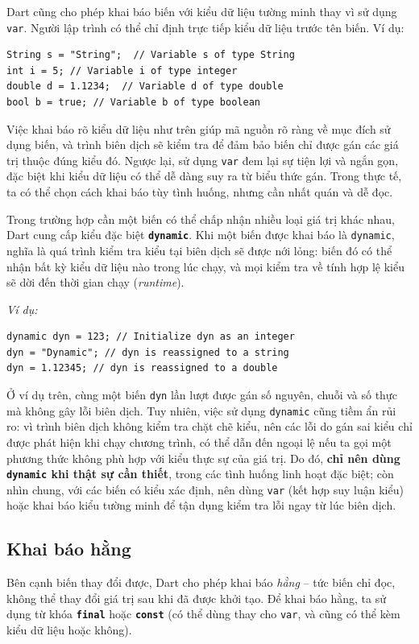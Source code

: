 \documentclass[../DoAn.tex]{subfiles}
\numberwithin{figure}{chapter}
\begin{document}
Dart cũng cho phép khai báo biến với kiểu dữ liệu tường minh thay vì sử dụng \texttt{var}. Người lập trình có thể chỉ định trực tiếp kiểu dữ liệu trước tên biến. Ví dụ:

\begin{lstlisting}
String s = "String";  // Variable s of type String
int i = 5; // Variable i of type integer
double d = 1.1234;  // Variable d of type double
bool b = true; // Variable b of type boolean
\end{lstlisting}

Việc khai báo rõ kiểu dữ liệu như trên giúp mã nguồn rõ ràng về mục đích sử dụng biến, và trình biên dịch sẽ kiểm tra để đảm bảo biến chỉ được gán các giá trị thuộc đúng kiểu đó. Ngược lại, sử dụng \texttt{var} đem lại sự tiện lợi và ngắn gọn, đặc biệt khi kiểu dữ liệu có thể dễ dàng suy ra từ biểu thức gán. Trong thực tế, ta có thể chọn cách khai báo tùy tình huống, nhưng cần nhất quán và dễ đọc. 

Trong trường hợp cần một biến có thể chấp nhận nhiều loại giá trị khác nhau, Dart cung cấp kiểu đặc biệt \textbf{\texttt{dynamic}}. Khi một biến được khai báo là \texttt{dynamic}, nghĩa là quá trình kiểm tra kiểu tại biên dịch sẽ được nới lỏng: biến đó có thể nhận bất kỳ kiểu dữ liệu nào trong lúc chạy, và mọi kiểm tra về tính hợp lệ kiểu sẽ dời đến thời gian chạy (\textit{runtime}). 

\textit{Ví dụ:} 
\begin{lstlisting}
dynamic dyn = 123; // Initialize dyn as an integer
dyn = "Dynamic"; // dyn is reassigned to a string
dyn = 1.12345; // dyn is reassigned to a double
\end{lstlisting}

Ở ví dụ trên, cùng một biến \texttt{dyn} lần lượt được gán số nguyên, chuỗi và số thực mà không gây lỗi biên dịch. Tuy nhiên, việc sử dụng \texttt{dynamic} cũng tiềm ẩn rủi ro: vì trình biên dịch không kiểm tra chặt chẽ kiểu, nên các lỗi do gán sai kiểu chỉ được phát hiện khi chạy chương trình, có thể dẫn đến ngoại lệ nếu ta gọi một phương thức không phù hợp với kiểu thực sự của giá trị. Do đó, \textbf{chỉ nên dùng \texttt{dynamic} khi thật sự cần thiết}, trong các tình huống linh hoạt đặc biệt; còn nhìn chung, với các biến có kiểu xác định, nên dùng \texttt{var} (kết hợp suy luận kiểu) hoặc khai báo kiểu tường minh để tận dụng kiểm tra lỗi ngay từ lúc biên dịch. 

\subsection{Khai báo hằng} 
Bên cạnh biến thay đổi được, Dart cho phép khai báo \textit{hằng} – tức biến chỉ đọc, không thể thay đổi giá trị sau khi đã được khởi tạo. Để khai báo hằng, ta sử dụng từ khóa \textbf{\texttt{final}} hoặc \textbf{\texttt{const}} (có thể dùng thay cho \texttt{var}, và cũng có thể kèm kiểu dữ liệu hoặc không). 
\end{document}
